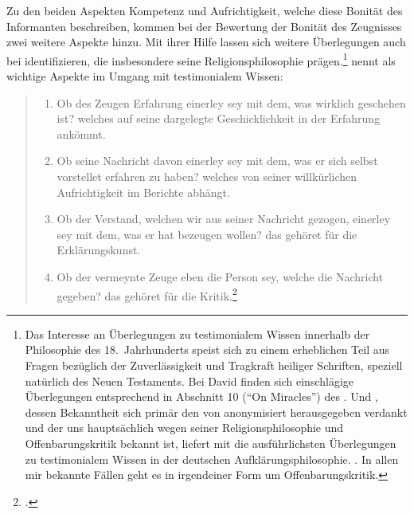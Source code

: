Zu den beiden Aspekten Kompetenz und Aufrichtigkeit, welche diese Bonität des
Informanten beschreiben, kommen bei der Bewertung der Bonität des Zeugnisses
zwei weitere Aspekte hinzu. Mit ihrer Hilfe lassen sich weitere
Überlegungen auch bei  identifizieren, die insbesondere seine
Religionsphilosophie prägen.\footnote{Das Interesse an Überlegungen zu
testimonialem Wissen innerhalb der Philosophie des 18.~Jahrhunderts speist sich
zu einem erheblichen Teil aus Fragen bezüglich der Zuverlässigkeit und Tragkraft
heiliger Schriften, speziell natürlich des Neuen Testaments. Bei David
 finden sich einschlägige Überlegungen entsprechend in
Abschnitt 10 (\enquote{On Miracles}) des . Und
,
dessen Bekanntheit sich primär den von 
anonymisiert herausgegeben  verdankt und der uns
hauptsächlich wegen seiner Religionsphilosophie und Offenbarungskritik bekannt
ist, liefert mit die ausführlichsten Überlegungen zu testimonialem Wissen in der
deutschen Aufklärungsphilosophie.
\cite[Vgl.][\S\S~239--258]{Reimarus:DieVernunftlehrealseineAnweisungzumrichtigenGebrauchderVernunftinderErkenntnisderWahrheit1756}.
In allen mir bekannte Fällen geht es in irgendeiner Form um Offenbarungskritik.}
nennt als wichtige Aspekte im Umgang mit testimonialem Wissen:
\begin{quote}
  \begin{enumerate}
  \item Ob des Zeugen Erfahrung einerley sey mit dem, was wirklich geschehen
  ist? welches auf seine dargelegte Geschicklichkeit in der Erfahrung ankömmt.
  \item Ob seine Nachricht davon einerley sey mit dem, was er sich selbst
  vorstellet erfahren zu haben? welches von seiner willkürlichen Aufrichtigkeit
  im Berichte abhängt.
  \item Ob der Verstand, welchen wir aus seiner Nachricht gezogen, einerley sey
  mit dem, was er hat bezeugen wollen? das gehöret für die Erklärungskunst.
  \item Ob der vermeynte Zeuge eben die Person sey, welche die Nachricht
  gegeben? das gehöret für die
  Kritik.\footnote{\Cite[][\S~240]{Reimarus:DieVernunftlehrealseineAnweisungzumrichtigenGebrauchderVernunftinderErkenntnisderWahrheit1756}.}
  \end{enumerate}
\end{quote}
